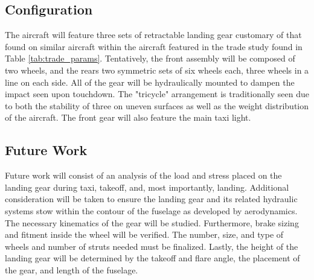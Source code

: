 \subsection{Configuration}
The aircraft will feature three sets of retractable landing gear customary of that found on similar aircraft within the aircraft featured in the trade study found in Table \ref{tab:trade_params}. Tentatively, the front assembly will be composed of two wheels, and the rears two symmetric sets of six wheels each, three wheels in a line on each side.  All of the gear will be hydraulically mounted to dampen the impact seen upon touchdown.  The "tricycle" arrangement is traditionally seen due to both the stability of three on uneven surfaces as well as the weight distribution of the aircraft.  The front gear will also feature the main taxi light.  

\subsection{Future Work}
Future work will consist of an analysis of the load and stress placed on the landing gear during taxi, takeoff, and, most importantly, landing.  Additional consideration will be taken to ensure the landing gear and its related hydraulic systems stow within the contour of the fuselage as developed by aerodynamics. The necessary kinematics of the gear will be studied. Furthermore, brake sizing and fitment inside the wheel will be verified. The number, size, and type of wheels and number of struts needed must be finalized. Lastly, the height of the landing gear will be determined by the takeoff and flare angle, the placement of the gear, and length of the fuselage.


